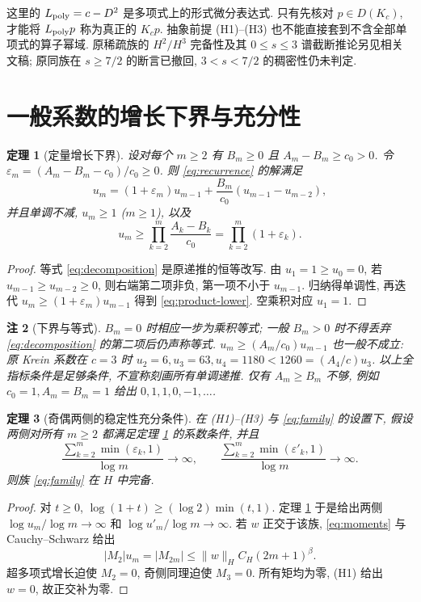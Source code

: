 \documentclass[UTF8]{ctexart}
\newtheorem{theorem}{定理}[section]
\newtheorem{remark}[theorem]{注}
\begin{document}
这里的 $L_{\rm poly}=c-D^2$ 是多项式上的形式微分表达式.
只有先核对 $p\in D(K_c)$, 才能将 $L_{\rm poly}p$ 称为真正的 $K_cp$.
抽象前提 (H1)--(H3) 也不能直接套到不含全部单项式的算子幂域.
原稀疏族的 $H^2/H^3$ 完备性及其 $0\le s\le3$ 谱截断推论另见相关文稿;
原同族在 $s\ge7/2$ 的断言已撤回, $3<s<7/2$ 的稠密性仍未判定.

\section{一般系数的增长下界与充分性}

\begin{theorem}[定量增长下界]\label{thm:growth}
设对每个 $m\ge2$ 有 $B_m\ge0$ 且 $A_m-B_m\ge c_0>0$.
令 $\varepsilon_m=(A_m-B_m-c_0)/c_0\ge0$.
则 \eqref{eq:recurrence} 的解满足
\begin{equation}\label{eq:decomposition}
u_m=(1+\varepsilon_m)u_{m-1}
+\frac{B_m}{c_0}(u_{m-1}-u_{m-2}),
\end{equation}
并且单调不减, $u_m\ge1$ ($m\ge1$), 以及
\begin{equation}\label{eq:product-lower}
u_m\ge \prod_{k=2}^m\frac{A_k-B_k}{c_0}
=\prod_{k=2}^m(1+\varepsilon_k).
\end{equation}
\end{theorem}
\begin{proof}
等式 \eqref{eq:decomposition} 是原递推的恒等改写.
由 $u_1=1\ge u_0=0$, 若 $u_{m-1}\ge u_{m-2}\ge0$,
则右端第二项非负, 第一项不小于 $u_{m-1}$.
归纳得单调性, 再迭代 $u_m\ge(1+\varepsilon_m)u_{m-1}$
得到 \eqref{eq:product-lower}. 空乘积对应 $u_1=1$.
\end{proof}

\begin{remark}[下界与等式]
$B_m=0$ 时相应一步为乘积等式; 一般 $B_m>0$ 时不得丢弃
\eqref{eq:decomposition} 的第二项后仍声称等式.
$u_m\ge (A_m/c_0)u_{m-1}$ 也一般不成立:
原 Krein 系数在 $c=3$ 时 $u_2=6,u_3=63,u_4=1180<1260=(A_4/c)u_3$.
以上全指标条件是足够条件, 不宣称刻画所有单调递推.
仅有 $A_m\ge B_m$ 不够, 例如 $c_0=1,A_m=B_m=1$
给出 $0,1,1,0,-1,\ldots$.
\end{remark}

\begin{theorem}[奇偶两侧的稳定性充分条件]\label{thm:stability}
在 (H1)--(H3) 与 \eqref{eq:family} 的设置下, 假设两侧对所有 $m\ge2$
都满足定理 \ref{thm:growth} 的系数条件, 并且
\[
\frac{\sum_{k=2}^m\min(\varepsilon_k,1)}{\log m}\longrightarrow\infty,
\qquad
\frac{\sum_{k=2}^m\min(\varepsilon'_k,1)}{\log m}\longrightarrow\infty .
\]
则族 \eqref{eq:family} 在 $H$ 中完备.
\end{theorem}
\begin{proof}
对 $t\ge0$, $\log(1+t)\ge(\log2)\min(t,1)$.
定理 \ref{thm:growth} 于是给出两侧 $\log u_m/\log m\to\infty$
和 $\log u'_m/\log m\to\infty$.
若 $w$ 正交于该族, \eqref{eq:moments} 与 Cauchy--Schwarz 给出
\[
|M_2|u_m=|M_{2m}|\le \|w\|_H C_H(2m+1)^\beta .
\]
超多项式增长迫使 $M_2=0$, 奇侧同理迫使 $M_3=0$.
所有矩均为零, (H1) 给出 $w=0$, 故正交补为零.
\end{proof}
\end{document}
